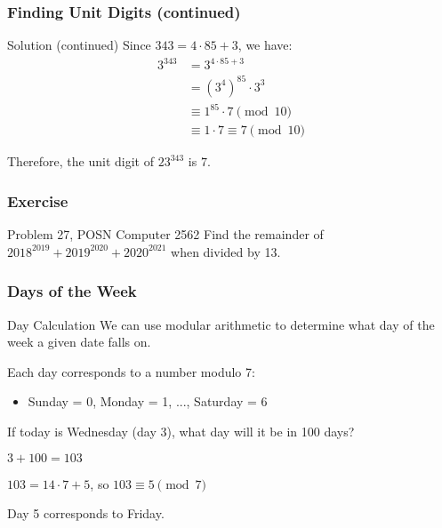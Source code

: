 \documentclass[10pt]{beamer}
\begin{document}
\begin{frame}
    \frametitle{Finding Unit Digits (continued)}
    \begin{block}{Solution (continued)}
        Since $343 = 4 \cdot 85 + 3$, we have:
        \begin{align}
            3^{343} & = 3^{4 \cdot 85 + 3}                \\
                    & = (3^4)^{85} \cdot 3^3              \\
                    & \equiv 1^{85} \cdot 7 \pmod{10}     \\
                    & \equiv 1 \cdot 7 \equiv 7 \pmod{10}
        \end{align}

        Therefore, the unit digit of $23^{343}$ is $\boxed{7}$.
    \end{block}
\end{frame}

\begin{frame}
    \frametitle{Exercise}
    \begin{block}{Problem 27, POSN Computer 2562}
        Find the remainder of $2018^{2019} + 2019^{2020} + 2020^{2021}$ when divided by 13.
    \end{block}

\end{frame}

\begin{frame}
    \frametitle{Days of the Week}
    \begin{block}{Day Calculation}
        We can use modular arithmetic to determine what day of the week a given date falls on.

        Each day corresponds to a number modulo 7:
        \begin{itemize}
            \item Sunday = 0, Monday = 1, ..., Saturday = 6
        \end{itemize}
    \end{block}

    \begin{example}
        If today is Wednesday (day 3), what day will it be in 100 days?

        $3 + 100 = 103$

        $103 = 14 \cdot 7 + 5$, so $103 \equiv 5 \pmod{7}$

        Day 5 corresponds to Friday.
    \end{example}
\end{frame}
\end{document}
